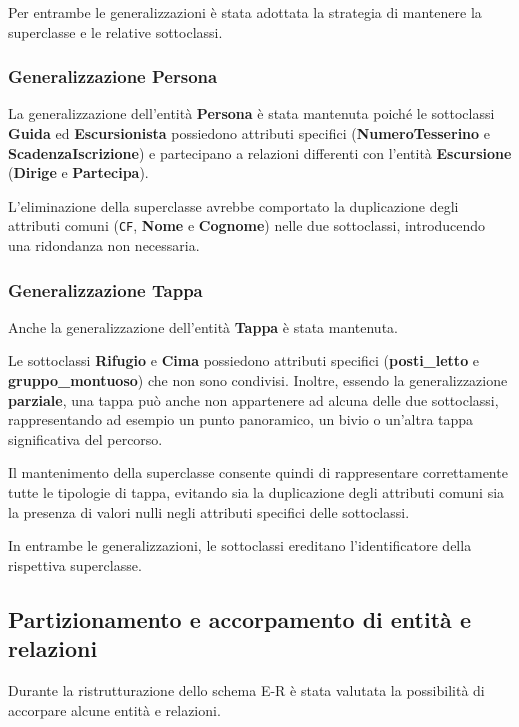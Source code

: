 \documentclass[10pt, a4paper]{article}
\begin{document}
Per entrambe le generalizzazioni è stata adottata la strategia di mantenere la superclasse e le relative sottoclassi.

\subsubsection{Generalizzazione Persona}

La generalizzazione dell'entità \textbf{Persona} è stata mantenuta poiché le sottoclassi \textbf{Guida} ed \textbf{Escursionista} possiedono attributi specifici (\textbf{NumeroTesserino} e \textbf{ScadenzaIscrizione}) e partecipano a relazioni differenti con l'entità \textbf{Escursione} (\textbf{Dirige} e \textbf{Partecipa}).

L'eliminazione della superclasse avrebbe comportato la duplicazione degli attributi comuni (\texttt{CF}, \textbf{Nome} e \textbf{Cognome}) nelle due sottoclassi, introducendo una ridondanza non necessaria.

\subsubsection{Generalizzazione Tappa}

Anche la generalizzazione dell'entità \textbf{Tappa} è stata mantenuta.

Le sottoclassi \textbf{Rifugio} e \textbf{Cima} possiedono attributi specifici (\textbf{posti\_letto} e \textbf{gruppo\_montuoso}) che non sono condivisi. Inoltre, essendo la generalizzazione \textbf{parziale}, una tappa può anche non appartenere ad alcuna delle due sottoclassi, rappresentando ad esempio un punto panoramico, un bivio o un'altra tappa significativa del percorso.

Il mantenimento della superclasse consente quindi di rappresentare correttamente tutte le tipologie di tappa, evitando sia la duplicazione degli attributi comuni sia la presenza di valori nulli negli attributi specifici delle sottoclassi.

In entrambe le generalizzazioni, le sottoclassi ereditano l'identificatore della rispettiva superclasse.


\subsection{Partizionamento e accorpamento di entità e relazioni}

Durante la ristrutturazione dello schema E-R è stata valutata la possibilità di accorpare alcune entità e relazioni.
\end{document}
